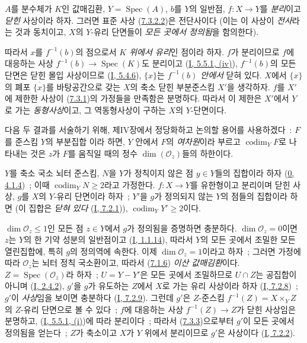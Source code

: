 \begin{proposition}[7.3.3]
\label{II.7.3.3-ko}
$A$를 분수체가 $K$인 값매김환, $Y=\operatorname{Spec}(A)$, $b$를 $Y$의
일반점, $f:X\to Y$를 \emph{분리}이고 \emph{닫힌} 사상이라 하자. 그러면
표준 사상 (\hyperref[II.7.3.2.2-ko]{7.3.2.2})은 전단사이다 (이는 이
사상이 \emph{전사}라는 것과 동치이고, $X$의 $Y$-유리 단면들이
\emph{모든 곳에서 정의됨}을 함의한다).
\end{proposition}

따라서 $x$를 $f^{-1}(b)$의 점으로서 \emph{$K$ 위에서 유리}인 점이라
하자. $f$가 분리이므로 $f$에 대응하는 사상
$f^{-1}(b)\to\operatorname{Spec}(K)$도 분리이고
(\hyperref[I.5.5.1-ko]{I, 5.5.1, (iv)}), $f^{-1}(b)$의 모든 단면은 닫힌
몰입 사상이므로 (\hyperref[I.5.4.6-ko]{I, 5.4.6}), $\{x\}$는
\emph{$f^{-1}(b)$ 안에서} 닫혀 있다. $X$에서 $\{x\}$의 폐포
$\overline{\{x\}}$를 바탕공간으로 갖는 $X$의 축소 닫힌 부분준스킴
$X'$을 생각하자. $f$를 $X'$에 제한한 사상이
(\hyperref[II.7.3.1-ko]{7.3.1})의 가정들을 만족함은 분명하다. 따라서
이 제한은 $X'$에서 $Y$로 가는 \emph{동형사상}이고, 그 역동형사상이
구하는 $X$의 $Y$-단면이다.

\begin{env}[7.3.4]
\label{II.7.3.4-ko}
다음 두 결과를 서술하기 위해, 제IV장에서 정당화하고 논의할 용어를
사용하겠다~: $F$를 준스킴 $Y$의 부분집합
이라 하면, $Y$ 안에서 $F$의 \emph{여차원}이라 부르고
$\operatorname{codim}_YF$로 나타내는 것은 $z$가 $F$를 움직일 때의 정수
$\dim(\mathcal{O}_z)$들의 하한이다.
\end{env}

\begin{corollary}[7.3.5]
\label{II.7.3.5-ko}
$Y$를 축소 국소 뇌터 준스킴, $N$을 $Y$가 정칙이지 않은 점 $y\in Y$들의
집합이라 하자 (\hyperref[0.4.1.4-ko]{0, 4.1.4})~; 이때
$\operatorname{codim}_YN\geq2$라고 가정한다. $f:X\to Y$를 유한형이고
분리이며 닫힌 사상, $g$를 $X$의 $Y$-유리 단면이라 하자~; $Y'$을 $g$가
정의되지 않는 $Y$의 점들의 집합이라 하면 (이 집합은 \emph{닫혀 있다}
(\hyperref[I.7.2.1-ko]{I, 7.2.1})),
$\operatorname{codim}_YY'\geq2$이다.
\end{corollary}

$\dim\mathcal{O}_z\leq1$인 모든 점 $z\in Y$에서 $g$가 정의됨을 증명하면
충분하다. $\dim\mathcal{O}_z=0$이면 $z$는 $Y$의 한 기약 성분의
일반점이고 (\hyperref[I.1.1.14-ko]{I, 1.1.14}), 따라서 $Y$의 모든
곳에서 조밀한 모든 열린집합에, 특히 $g$의 정의역에 속한다. 이제
$\dim\mathcal{O}_z=1$이라고 하자~; 그러면 가정에 따라
$\mathcal{O}_z$는 뇌터 정칙 국소환이고, 따라서
(\hyperref[II.7.1.6-ko]{7.1.6}) \emph{이산 값매김환}이다.
$Z=\operatorname{Spec}(\mathcal{O}_z)$라 하자~; $U=Y-Y'$은 모든 곳에서
조밀하므로 $U\cap Z$는 공집합이 아니며
(\hyperref[I.2.4.2-ko]{I, 2.4.2}), $g'$을 $g$가 유도하는 $Z$에서 $X$로
가는 유리 사상이라 하자 (\hyperref[I.7.2.8-ko]{I, 7.2.8})~; $g'$이
\emph{사상}임을 보이면 충분하다 (\hyperref[I.7.2.9-ko]{I, 7.2.9}).
그런데 $g'$은 $Z$-준스킴 $f^{-1}(Z)=X\times_YZ$의 $Z$-유리 단면으로
볼 수 있다~; $f$에 대응하는 사상 $f^{-1}(Z)\to Z$가 닫힌 사상임은
분명하고, (\hyperref[I.5.5.1-ko]{I, 5.5.1, (i)})에 따라 분리이다~;
따라서 (\hyperref[II.7.3.3-ko]{7.3.3})으로부터 $g'$이 모든 곳에서
정의됨을 얻는다~; $Z$가 축소이고 $X$가 $Y$ 위에서 분리이므로 $g'$은
사상이다 (\hyperref[I.7.2.2-ko]{I, 7.2.2}).

